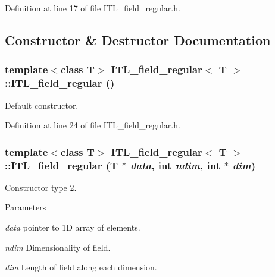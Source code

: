 Definition at line 17 of file ITL\_\-field\_\-regular.h.



\subsection{Constructor \& Destructor Documentation}
\hypertarget{classITL__field__regular_aca410e01f42b3cfd6c0d6e326e1a1136}{
\subsubsection[{ITL\_\-field\_\-regular}]{\setlength{\rightskip}{0pt plus 5cm}template$<$class T$>$ {\bf ITL\_\-field\_\-regular}$<$ T $>$::{\bf ITL\_\-field\_\-regular} ()}}
\label{classITL__field__regular_aca410e01f42b3cfd6c0d6e326e1a1136}


Default constructor. 



Definition at line 24 of file ITL\_\-field\_\-regular.h.

\hypertarget{classITL__field__regular_abd45e2ed6be99bf2b5a058e39a47b18d}{
\subsubsection[{ITL\_\-field\_\-regular}]{\setlength{\rightskip}{0pt plus 5cm}template$<$class T$>$ {\bf ITL\_\-field\_\-regular}$<$ T $>$::{\bf ITL\_\-field\_\-regular} (T $\ast$ {\em data}, \/  int {\em ndim}, \/  int $\ast$ {\em dim})}}
\label{classITL__field__regular_abd45e2ed6be99bf2b5a058e39a47b18d}


Constructor type 2. 


\begin{DoxyParams}{Parameters}
\item[{\em data}]pointer to 1D array of elements. \item[{\em ndim}]Dimensionality of field. \item[{\em dim}]Length of field along each dimension. \end{DoxyParams}


